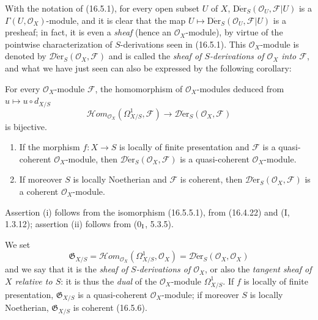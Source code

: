 \begin{env}[16.5.4]\label{IV.16.5.4}
With the notation of (16.5.1), for every open subset $U$ of $X$,
$\operatorname{D\acute{e}r}_S(\mathcal{O}_U,\mathscr{F}|U)$ is a
$\Gamma(U,\mathcal{O}_X)$-module, and it is clear that the map
$U\mapsto\operatorname{D\acute{e}r}_S(\mathcal{O}_U,\mathscr{F}|U)$ is a
presheaf; in fact, it is even a \emph{sheaf} (hence an
$\mathcal{O}_X$-module), by virtue of the pointwise characterization of
$S$-derivations seen in (16.5.1). This $\mathcal{O}_X$-module is denoted by
$\mathscr{D}\!\mathrm{\acute{e}r}_S(\mathcal{O}_X,\mathscr{F})$ and is called the
\emph{sheaf of $S$-derivations of $\mathcal{O}_X$ into $\mathscr{F}$}, and
what we have just seen can also be expressed by the following corollary:
\end{env}

\begin{corollary}[16.5.5]
\label{IV.16.5.5}
For every $\mathcal{O}_X$-module $\mathscr{F}$, the homomorphism of
$\mathcal{O}_X$-modules deduced from $u\mapsto u\circ d_{X/S}$
\[
  \mathscr{H}\!om_{\mathcal{O}_X}(\Omega_{X/S}^1,\mathscr{F})
  \longrightarrow
  \mathscr{D}\!\mathrm{\acute{e}r}_S(\mathcal{O}_X,\mathscr{F})
  \tag{16.5.5.1}
  \label{IV.16.5.5.1}
\]
is bijective.
\end{corollary}

\begin{corollary}[16.5.6]
\label{IV.16.5.6}
\begin{enumerate}
\item[(i)] If the morphism $f:X\to S$ is locally of finite presentation and
$\mathscr{F}$ is a quasi-coherent $\mathcal{O}_X$-module, then
$\mathscr{D}\!\mathrm{\acute{e}r}_S(\mathcal{O}_X,\mathscr{F})$ is a
quasi-coherent $\mathcal{O}_X$-module.
\item[(ii)] If moreover $S$ is locally Noetherian and $\mathscr{F}$ is
coherent, then $\mathscr{D}\!\mathrm{\acute{e}r}_S(\mathcal{O}_X,\mathscr{F})$ is a
coherent $\mathcal{O}_X$-module.
\end{enumerate}
\end{corollary}

Assertion (i) follows from the isomorphism (16.5.5.1), from (16.4.22) and
(I, 1.3.12); assertion (ii) follows from (0$_{\rm I}$, 5.3.5).

\begin{env}[16.5.7]\label{IV.16.5.7}
We set
\[
  \mathfrak{G}_{X/S}=
  \mathscr{H}\!om_{\mathcal{O}_X}(\Omega_{X/S}^1,\mathcal{O}_X)
  =\mathscr{D}\!\mathrm{\acute{e}r}_S(\mathcal{O}_X,\mathcal{O}_X)
  \tag{16.5.7.1}
  \label{IV.16.5.7.1}
\]
and we say that it is the \emph{sheaf of $S$-derivations of
$\mathcal{O}_X$}, or also the \emph{tangent sheaf of $X$ relative to
$S$}: it is thus the \emph{dual} of the $\mathcal{O}_X$-module
$\Omega_{X/S}^1$. If $f$ is locally of finite
presentation, $\mathfrak{G}_{X/S}$ is a quasi-coherent $\mathcal{O}_X$-module; if
moreover $S$ is locally Noetherian, $\mathfrak{G}_{X/S}$ is coherent
(16.5.6).
\end{env}

